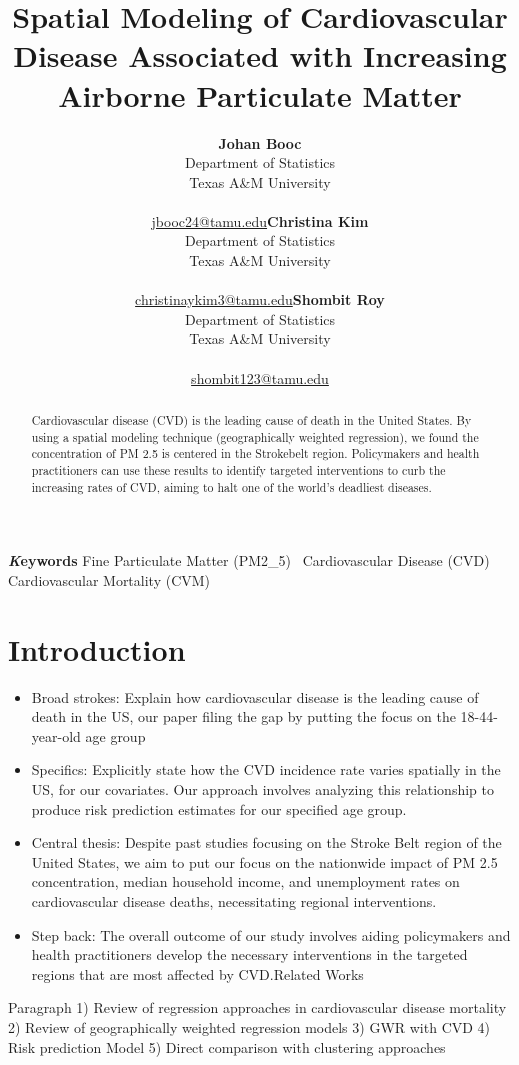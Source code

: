 \documentclass[
]{article}
\title{Spatial Modeling of Cardiovascular Disease Associated with
Increasing Airborne Particulate Matter}
\author{\textbf{Johan Booc}\\Department of Statistics\\Texas A\&M
University\\\\\href{mailto:jbooc24@tamu.edu}{jbooc24@tamu.edu}\asep\textbf{Christina
Kim}\\Department of Statistics\\Texas A\&M
University\\\\\href{mailto:christinaykim3@tamu.edu}{christinaykim3@tamu.edu}\asep\textbf{Shombit
Roy}\\Department of Statistics\\Texas A\&M
University\\\\\href{mailto:shombit123@tamu.edu}{shombit123@tamu.edu}}
\date{}
\begin{document}
\maketitle
\begin{abstract}
Cardiovascular disease (CVD) is the leading cause of death in the United
States. By using a spatial modeling technique (geographically weighted
regression), we found the concentration of PM 2.5 is centered in the
Strokebelt region. Policymakers and health practitioners can use these
results to identify targeted interventions to curb the increasing rates
of CVD, aiming to halt one of the world's deadliest diseases.
\end{abstract}
{\bfseries \emph Keywords}
\def\sep{\textbullet\ }
Fine Particulate Matter (PM2\_5) \sep Cardiovascular Disease (CVD) \sep 
Cardiovascular Mortality (CVM)


\section{Introduction}\label{sec-intro}

\begin{itemize}
\item
  Broad strokes: Explain how cardiovascular disease is the leading cause
  of death in the US, our paper filing the gap by putting the focus on
  the 18-44-year-old age group~
\item
  Specifics: Explicitly state how the CVD incidence rate varies
  spatially in the US, for our covariates. Our approach involves
  analyzing this relationship to produce risk prediction estimates for
  our specified age group.~
\item
  Central thesis: Despite past studies focusing on the Stroke Belt
  region of the United States, we aim to put our focus on the nationwide
  impact of PM 2.5 concentration, median household income, and
  unemployment rates on cardiovascular disease deaths, necessitating
  regional interventions.
\item
  Step back: The overall outcome of our study involves aiding
  policymakers and health practitioners develop the necessary
  interventions in the targeted regions that are most affected by
  CVD.Related Works
\end{itemize}

Paragraph 1) Review of regression approaches in cardiovascular disease
mortality 2) Review of geographically weighted regression models 3) GWR
with CVD 4) Risk prediction Model 5) Direct comparison with clustering
approaches
\end{document}
